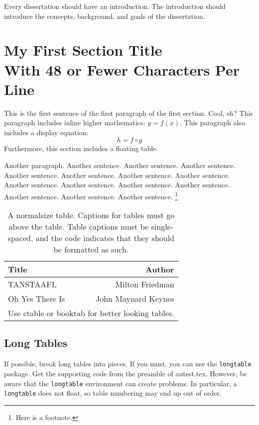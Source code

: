\documentclass[12pt,econ]{authesis}
\begin{document}
Every dissertation should have an introduction.
The introduction should introduce the concepts, background, and goals of the dissertation.


%
%
\section{My First Section Title\\With 48 or Fewer Characters Per Line}

This is the first sentence of the first paragraph of the first section. Cool, eh?
This paragraph includes inline higher mathematics: $y=f(x)$.
This paragraph also includes a display equation:
\begin{equation}
h = f \circ g
\end{equation}
Furthermore, this section includes a floating table.

Another paragraph.
Another sentence. Another sentence. Another sentence. Another sentence. Another sentence. Another sentence. Another sentence. Another sentence. Another sentence. Another sentence. Another sentence. Another sentence. Another sentence. Another sentence.%
\footnote{%
Here is a footnote.}
%


\begin{table}[h]\centering
\caption{A normalsize table.
Captions for tables must go above the table.
Table captions must be single-spaced,
and the code indicates that they should be formatted as such.}
\begin{tabular}{lr}\hline\hline
Title & Author \\ \hline
TANSTAAFL & Milton Friedman \\
Oh Yes There Is & John Maynard Keynes \\ \hline
\multicolumn{2}{c}{\small Use ctable or booktab for better looking tables.}
\end{tabular}
\end{table}

\subsection{Long Tables}

If possible, break long tables into pieces.
If you must, you can use the \texttt{longtable} package.
Get the supporting code from the preamble of autest.tex.
However, be aware that the \texttt{longtable} environment
can create problems.
In particular, a \texttt{longtable} does not float,
so table numbering may end up out of order.
\end{document}
